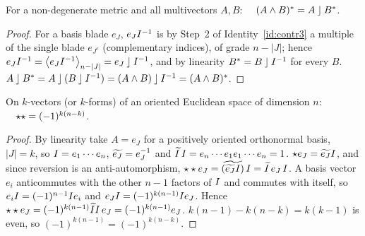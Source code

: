 \begin{identity}\label{id:dual}
For a non-degenerate metric and all multivectors $A,B$: $\quad(A\wedge B)^{\ast}=A\mathbin{\rfloor}B^{\ast}$.
\end{identity}
\begin{proof}
 For a basis blade $e_J$, $e_JI^{-1}$ is by Step~2 of Identity~\ref{id:contr3} a multiple of
the single blade $e_{J^c}$ (complementary indices), of grade $n-|J|$; hence $e_JI^{-1}=\left\langle e_JI^{-1} \right\rangle_{n-|J|}=e_J\mathbin{\rfloor}I^{-1}$, and
by linearity $B^{\ast}=B\mathbin{\rfloor}I^{-1}$ for every $B$.
 $A\mathbin{\rfloor}B^{\ast}=A\mathbin{\rfloor}(B\mathbin{\rfloor}I^{-1})=(A\wedge B)\mathbin{\rfloor}I^{-1}=(A\wedge B)^{\ast}$.
\end{proof}

\begin{identity}\label{id:hodgehodge}
On $k$-vectors (or $k$-forms) of an oriented Euclidean space of dimension $n$: $\quad\star\star=(-1)^{k(n-k)}$.
\end{identity}
\begin{proof}
 By linearity take $A=e_J$ for a positively oriented orthonormal basis, $|J|=k$, so $I=e_1\cdots e_n$,
$\widetilde{e_J}=e_J^{-1}$ and $\widetilde{I}\,I=e_n\cdots e_1e_1\cdots e_n=1$.
 $\star e_J=\widetilde{e_J}I$, and since reversion is an anti-automorphism,
$\star\star e_J=\widetilde{(\widetilde{e_J}I)}\,I=\widetilde{I}\,e_J\,I$.
 A basis vector $e_i$ anticommutes with the other $n-1$ factors of $I$ and commutes with itself,
so $e_iI=(-1)^{n-1}I e_i$ and $e_JI=(-1)^{k(n-1)}I e_J$. Hence $\star\star e_J=(-1)^{k(n-1)}\widetilde{I}I\,e_J=(-1)^{k(n-1)}e_J$.
 $k(n-1)-k(n-k)=k(k-1)$ is even, so $(-1)^{k(n-1)}=(-1)^{k(n-k)}$.
\end{proof}
